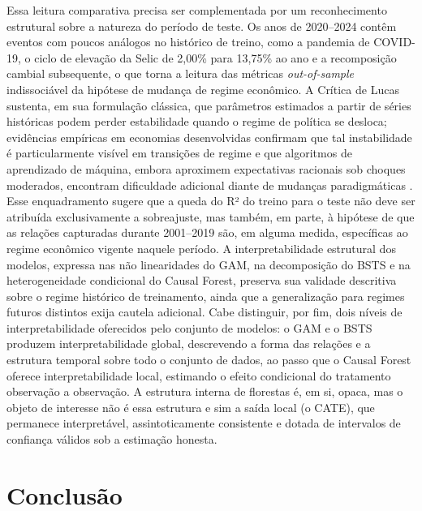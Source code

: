 \documentclass[	12pt, Times, openright, oneside, a4paper, english, brazil]{abntex2}
\begin{document}
Essa leitura comparativa precisa ser complementada por um reconhecimento estrutural sobre a natureza do período de teste. Os anos de 2020--2024 contêm eventos com poucos análogos no histórico de treino, como a pandemia de COVID-19, o ciclo de elevação da Selic de 2,00\% para 13,75\% ao ano e a recomposição cambial subsequente, o que torna a leitura das métricas \textit{out-of-sample} indissociável da hipótese de mudança de regime econômico. A Crítica de Lucas \cite{lucas1976critique} sustenta, em sua formulação clássica, que parâmetros estimados a partir de séries históricas podem perder estabilidade quando o regime de política se desloca; evidências empíricas em economias desenvolvidas confirmam que tal instabilidade é particularmente visível em transições de regime \cite{lubik2010stability} e que algoritmos de aprendizado de máquina, embora aproximem expectativas racionais sob choques moderados, encontram dificuldade adicional diante de mudanças paradigmáticas \cite{castelnuovo2022ml}. Esse enquadramento sugere que a queda do R² do treino para o teste não deve ser atribuída exclusivamente a sobreajuste, mas também, em parte, à hipótese de que as relações capturadas durante 2001--2019 são, em alguma medida, específicas ao regime econômico vigente naquele período. A interpretabilidade estrutural dos modelos, expressa nas não linearidades do GAM, na decomposição do BSTS e na heterogeneidade condicional do Causal Forest, preserva sua validade descritiva sobre o regime histórico de treinamento, ainda que a generalização para regimes futuros distintos exija cautela adicional. Cabe distinguir, por fim, dois níveis de interpretabilidade oferecidos pelo conjunto de modelos: o GAM e o BSTS produzem interpretabilidade global, descrevendo a forma das relações e a estrutura temporal sobre todo o conjunto de dados, ao passo que o Causal Forest oferece interpretabilidade local, estimando o efeito condicional do tratamento observação a observação. A estrutura interna de florestas é, em si, opaca, mas o objeto de interesse não é essa estrutura e sim a saída local (o CATE), que permanece interpretável, assintoticamente consistente e dotada de intervalos de confiança válidos sob a estimação honesta.

% 

\chapter{Conclusão}
\end{document}

